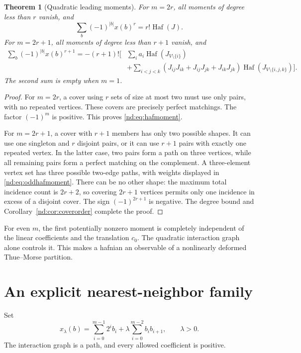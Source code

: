 \documentclass[11pt,a4paper,oneside,openany]{book}
\numberwithin{equation}{chapter}
\newtheorem{theorem}{Theorem}[chapter]
\theoremstyle{definition}
\theoremstyle{remark}
\DeclareMathOperator{\Haf}{Haf}
\begin{document}
\begin{theorem}[Quadratic leading moments]
\label{nd:thm:haf}
For \(m=2r\), all moments of degree less than \(r\) vanish, and
\begin{equation}
 \sum_b(-1)^{|b|}x(b)^r=r!\Haf(J).
 \label{nd:eq:hafmoment}
\end{equation}
For \(m=2r+1\), all moments of degree less than \(r+1\) vanish, and
\begin{equation}
\begin{split}
 \sum_b(-1)^{|b|}x(b)^{r+1}=-(r+1)!\Bigg[&
 \sum_i a_i\Haf(J_{V\setminus\{i\}})\\
 &+\sum_{i<j<k}(J_{ij}J_{ik}+J_{ij}J_{jk}+J_{ik}J_{jk})
                  \Haf(J_{V\setminus\{i,j,k\}})\Bigg].
\end{split}
\label{nd:eq:oddhafmoment}
\end{equation}
The second sum is empty when \(m=1\).
\end{theorem}
\begin{proof}
For \(m=2r\), a cover using \(r\) sets of size at most two must use only
pairs, with no repeated vertices. These covers are precisely perfect matchings.
The factor \((-1)^m\) is positive. This proves \eqref{nd:eq:hafmoment}.

For \(m=2r+1\), a cover with \(r+1\) members has only two possible shapes.
It can use one singleton and \(r\) disjoint pairs, or it can use \(r+1\) pairs
with exactly one repeated vertex. In the latter case, two pairs form a path
on three vertices, while all remaining pairs form a perfect matching on the
complement. A three-element vertex set has three possible two-edge paths,
with weights displayed in \eqref{nd:eq:oddhafmoment}. There can be no other shape:
the maximum total incidence count is \(2r+2\), so covering \(2r+1\) vertices
permits only one incidence in excess of a disjoint cover. The sign
\((-1)^{2r+1}\) is negative. The degree bound and
Corollary~\ref{nd:cor:coverorder} complete the proof.
\end{proof}

For even \(m\), the first potentially nonzero moment is completely independent
of the linear coefficients and the translation \(c_0\). The quadratic
interaction graph alone controls it. This makes a hafnian an observable of a
nonlinearly deformed Thue--Morse partition.

\section{An explicit nearest-neighbor family}
Set
\begin{equation}
 x_\lambda(b)=\sum_{i=0}^{m-1}2^ib_i
              +\lambda\sum_{i=0}^{m-2}b_ib_{i+1},\qquad \lambda>0.
 \label{nd:eq:pathgeometry}
\end{equation}
The interaction graph is a path, and every allowed coefficient is positive.
\end{document}
